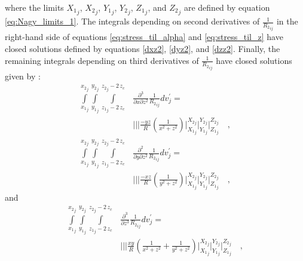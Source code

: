 \documentclass[P]{BrJG_submit}
\begin{document}
where the limits ${X_1}_{j}$, ${X_2}_{j}$, ${Y_1}_{j}$, ${Y_2}_{j}$, ${Z_1}_{j}$, and ${Z_2}_{j}$ are defined by equation \ref{eq:Nagy_limits_1}.
The integrals depending on second derivatives of $\frac{1}{{R_2}_{ij}}$ in the 
right-hand side of equations \ref{eq:stress_til_alpha} and \ref{eq:stress_til_z} 
have closed solutions defined by equations \ref{dxz2}, \ref{dyz2}, and \ref{dzz2}.
Finally, the remaining integrals depending on third derivatives of 
$\frac{1}{{R_2}_{ij}}$ have closed solutions given by 
\citep{Nagyetal2000, Nagyetal2002}:
\begin{equation}
\begin{aligned}
\int\limits_{{x_{1}}_{j}}^{{x_{2}}_{j}} 
\int\limits_{{y_{1}}_{j}}^{{y_{2}}_{j}} 
\int\limits_{{z_{1}}_{j} - 2 \, z_c}^{{z_{2}}_{j} - 2 \, z_c}
\! \! \! \! \! \! \! \! 
& \frac{\partial^{3}}{\partial x \partial z^{2}} 
{\frac{1}{{R_2}_{ij}}} dv_{j}^{\prime} \! = \! \\
& \Bigg|\Bigg|\Bigg| 
\frac{- y z}{R} 
\left( \frac{1}{x^{2} + z^{2}} \right)
\Bigg|_{{X_1}_{j}}^{{X_2}_{j}} \Bigg|_{{Y_1}_{j}}^{{Y_2}_{j}} \Bigg|_{{Z_1}_{j}}^{{Z_2}_{j}} \quad ,
\end{aligned}
\label{sxzz}
\end{equation}
\begin{equation}
\begin{aligned}
\int\limits_{{x_{1}}_{j}}^{{x_{2}}_{j}} \int\limits_{{y_{1}}_{j}}^{{y_{2}}_{j}} 
\int\limits_{{z_{1}}_{j} - 2 \, z_c}^{{z_{2}}_{j} - 2 \, z_c}
\! \! \! \! \! \! \! \! 
& \frac{\partial^{2}  }{\partial y \partial z^{2}} 
{\frac{1}{{R_2}_{ij}}} dv_{j}^{\prime} \! = \! \\
& \Bigg|\Bigg|\Bigg|
\frac{- x z}{R} 
\left( \frac{1}{y^{2} + z^{2}} \right)
\Bigg|_{{X_1}_{j}}^{{X_2}_{j}} \Bigg|_{{Y_1}_{j}}^{{Y_2}_{j}} \Bigg|_{{Z_1}_{j}}^{{Z_2}_{j}} \quad ,
\end{aligned}
\label{syzz}
\end{equation}
and
\begin{equation}
\begin{aligned}
\int\limits_{{x_{1}}_{j}}^{{x_{2}}_{j}} \int\limits_{{y_{1}}_{j}}^{{y_{2}}_{j}} \int\limits_{{z_{1}}_{j} - 2 \, z_c}^{{z_{2}}_{j} - 2 \, z_c}
\! \! \! \! \! \! \! \! 
& \frac{\partial^{3}  }{\partial z^{3}} 
{\frac{1}{{R_2}_{ij}}} dv_{j}^{\prime} \! = \! \\
& \Bigg|\Bigg|\Bigg|
\frac{ x y}{R} 
\left( \frac{1}{x^{2} + z^{2}} + \frac{1}{y^{2} + z^{2}} \right)
\Bigg|_{{X_1}_{j}}^{{X_2}_{j}} \Bigg|_{{Y_1}_{j}}^{{Y_2}_{j}} \Bigg|_{{Z_1}_{j}}^{{Z_2}_{j}} \quad ,
\end{aligned}
\label{sz3}
\end{equation}
\end{document}
